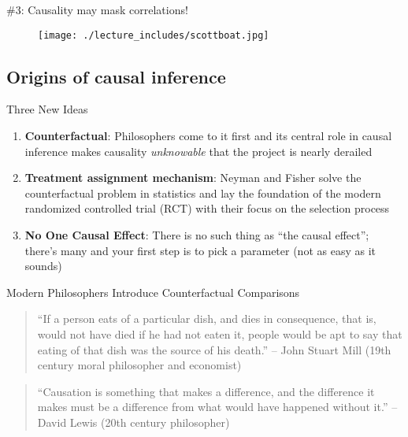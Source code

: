 \documentclass{beamer}
\begin{document}
\begin{frame}{\#3: Causality may mask correlations!}

  \begin{figure}
    \centering
    \texttt{[image: ./lecture\_includes/scottboat.jpg]}
  \end{figure}

\end{frame}

\subsection{Origins of causal inference}


\begin{frame}{Three New Ideas}

\begin{enumerate}
\item \textbf{Counterfactual}: Philosophers come to it first and its central role in causal inference makes causality \emph{unknowable} that the project is nearly derailed
\item \textbf{Treatment assignment mechanism}: Neyman and Fisher solve the counterfactual problem in statistics and lay the foundation of the modern randomized controlled trial (RCT) with their focus on the selection process
\item \textbf{No One Causal Effect}: There is no such thing as ``the causal effect''; there's many and your first step is to pick a parameter (not as easy as it sounds)
\end{enumerate}


\end{frame}



\begin{frame}{Modern Philosophers Introduce Counterfactual Comparisons}

\begin{quote}
    ``If a person eats of a particular dish, and dies in consequence, that is, would not have died if he had not eaten it, people would be apt to say that eating of that dish was the source of his death.'' -- John Stuart Mill (19th century moral philosopher and economist)
\end{quote}

\bigskip
  
    \begin{quote}
    ``Causation is something that makes a difference, and the difference it makes must be a difference from what would have happened without it.'' -- David Lewis (20th century philosopher)
\end{quote}

\end{frame}
\end{document}
